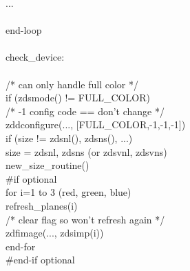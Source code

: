 \begin{tabbing}
\>\>\>...\\
  \\
\>end-loop\\
  \\
\>check\_device:\\
  \\
\>/*  can only handle full color  */\\
\>if (zdsmode() != FULL\_COLOR)\\
\>\>/*  -1 config code == don't change  */\\
\>\>zddconfigure(..., [FULL\_COLOR,-1,-1,-1])\\
\>\>if (size != zdsnl(), zdsns(), ...)\\
\>\>\>size = zdsnl, zdsns (or zdsvnl, zdsvns)\\
\>\>\>new\_size\_routine()\\
\>\#if optional\\
\>\>\>for i=1 to 3 (red, green, blue)\\
\>\>\>\>refresh\_planes(i)\\
\>\>\>\>/* clear flag so won't refresh again */\\
\>\>\>\>zdfimage(..., zdsimp(i))\\
\>\>\>end-for\\
\>\#end-if optional\\
\end{tabbing}

